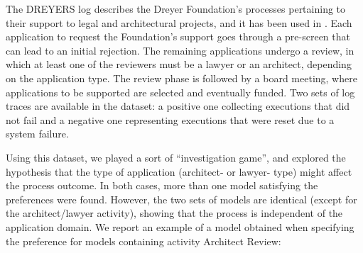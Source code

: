 The DREYERS log describes the Dreyer Foundation’s processes pertaining to their support to legal and architectural projects, and it has been used in \cite{DBLP:conf/ssci/DeboisS15,DBLP:conf/bpm/SlaatsDB21}. Each application to request the Foundation's support goes through a pre-screen that can lead to an initial rejection. The remaining applications undergo a review, in which at least one of the reviewers must be a lawyer or an architect, depending on the application type. The review phase is followed by a board meeting, where applications to be supported are selected and eventually funded.
Two sets of log traces are available in the dataset: a positive one collecting executions that did not fail and a negative one representing executions that were reset due to a system failure. %

Using this dataset, we played a sort of ``investigation game'', and explored the hypothesis that the type of application (architect- or lawyer- type) might affect the process outcome.
%
In both cases, more than one model %
satisfying the preferences were found. However, the two sets of models are identical (except for the architect/lawyer activity), showing that the process is independent of the application domain.
We report an example of a model obtained when specifying the preference for models containing activity \textsf{Architect Review}:
%

